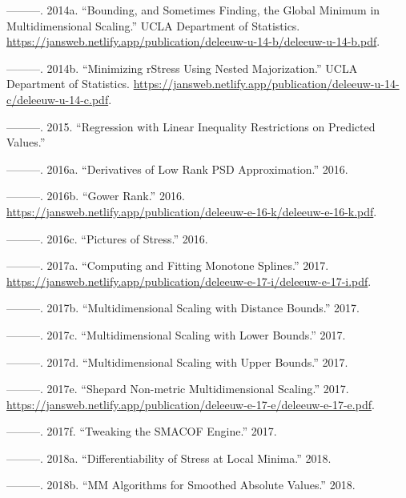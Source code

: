 \documentclass[
  12pt,
  letterpaper,
  DIV=11,
  numbers=noendperiod]{scrreprt}
\newlength{\cslhangindent}
\newenvironment{CSLReferences}[2] %
 {\begin{list}{}{%
  \setlength{\itemindent}{0pt}
  \setlength{\leftmargin}{0pt}
  \setlength{\parsep}{0pt}
  \ifodd #1
   \setlength{\leftmargin}{\cslhangindent}
   \setlength{\itemindent}{-1\cslhangindent}
  \fi
  \setlength{\itemsep}{#2\baselineskip}}}
 {\end{list}}
\theoremstyle{remark}
\begin{document}
\begin{CSLReferences}{1}{0}
---------. 2014a. {``{Bounding, and Sometimes Finding, the Global
Minimum in Multidimensional Scaling}.''} UCLA Department of Statistics.
\url{https://jansweb.netlify.app/publication/deleeuw-u-14-b/deleeuw-u-14-b.pdf}.

---------. 2014b. {``{Minimizing rStress Using Nested Majorization}.''}
UCLA Department of Statistics.
\url{https://jansweb.netlify.app/publication/deleeuw-u-14-c/deleeuw-u-14-c.pdf}.

---------. 2015. {``Regression with Linear Inequality Restrictions on
Predicted Values.''}

---------. 2016a. {``{Derivatives of Low Rank PSD Approximation}.''}
2016.

---------. 2016b. {``Gower Rank.''} 2016.
\url{https://jansweb.netlify.app/publication/deleeuw-e-16-k/deleeuw-e-16-k.pdf}.

---------. 2016c. {``Pictures of Stress.''} 2016.

---------. 2017a. {``{Computing and Fitting Monotone Splines}.''} 2017.
\url{https://jansweb.netlify.app/publication/deleeuw-e-17-i/deleeuw-e-17-i.pdf}.

---------. 2017b. {``{Multidimensional Scaling with Distance Bounds}.''}
2017.

---------. 2017c. {``{Multidimensional Scaling with Lower Bounds}.''}
2017.

---------. 2017d. {``{Multidimensional Scaling with Upper Bounds}.''}
2017.

---------. 2017e. {``{Shepard Non-metric Multidimensional Scaling}.''}
2017.
\url{https://jansweb.netlify.app/publication/deleeuw-e-17-e/deleeuw-e-17-e.pdf}.

---------. 2017f. {``{Tweaking the SMACOF Engine}.''} 2017.

---------. 2018a. {``{Differentiability of Stress at Local Minima}.''}
2018.

---------. 2018b. {``{MM Algorithms for Smoothed Absolute Values}.''}
2018.


\end{CSLReferences}
\end{document}

